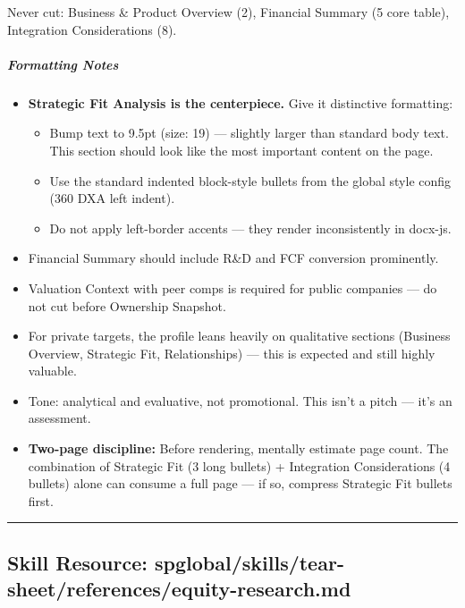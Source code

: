 \documentclass[11pt]{article}
\begin{document}
Never cut: Business \& Product Overview (2), Financial Summary (5 core table), Integration Considerations (8).


\subparagraph{Formatting Notes}\mbox{}\par
\begin{itemize}[leftmargin=*,itemsep=2pt,topsep=2pt]
\item {} \textbf{Strategic Fit Analysis is the centerpiece.} Give it distinctive formatting:
\begin{itemize}[leftmargin=*,itemsep=2pt,topsep=2pt]
\item {} Bump text to 9.5pt (size: 19) — slightly larger than standard body text. This section should look like the most important content on the page.
\item {} Use the standard indented block-style bullets from the global style config (360 DXA left indent).
\item {} Do not apply left-border accents — they render inconsistently in docx-js.
\end{itemize}
\item {} Financial Summary should include R\&D and FCF conversion prominently.
\item {} Valuation Context with peer comps is required for public companies — do not cut before Ownership Snapshot.
\item {} For private targets, the profile leans heavily on qualitative sections (Business Overview, Strategic Fit, Relationships) — this is expected and still highly valuable.
\item {} Tone: analytical and evaluative, not promotional. This isn't a pitch — it's an assessment.
\item {} \textbf{Two-page discipline:} Before rendering, mentally estimate page count. The combination of Strategic Fit (3 long bullets) + Integration Considerations (4 bullets) alone can consume a full page — if so, compress Strategic Fit bullets first.
\end{itemize}

\vspace{0.8em}\hrule\vspace{0.8em}

\subsection{Skill Resource: spglobal/skills/tear-sheet/references/equity-research.md}\label{file:spglobal-skills-tear-sheet-references-equity-research.md}
\end{document}
